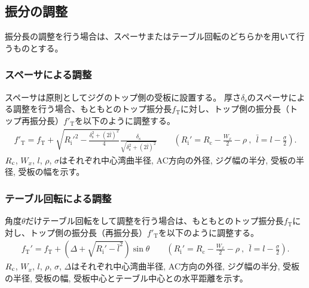 \subsection{振分の調整}
振分長の調整を行う場合は、スペーサまたはテーブル回転のどちらかを用いて行うものとする。

\subsubsection{スペーサによる調整}
スペーサは原則としてジグのトップ側の受板に設置する。
厚さ$\delta_\mathrm s$のスペーサによる調整を行う場合、もともとのトップ振分長$f_\mathrm T$に対し、トップ側の振分長（トップ再振分長）$f'_\mathrm T$を以下のように調整する。
\begin{align*}
  f'_\mathrm T
  = f_\mathrm T
    +\sqrt{R_\mathrm i'^2-\frac{\delta_\mathrm s^2+(2\bar l)^2}4}\frac{\delta_\mathrm s}{\sqrt{\delta_\mathrm s^2+(2\bar l)^2}}\qquad
    \left(R_\mathrm i' = R_\mathrm c-\frac{W_x}2-\rho~,~~\bar l = l-\frac\sigma2\right).
\end{align*}
$R_\textrm c$, $W_x$, $l$, $\rho$, $\sigma$はそれぞれ中心湾曲半径, AC方向の外径, ジグ幅の半分, 受板の半径, 受板の幅を示す。

\subsubsection{テーブル回転による調整}
角度$\theta$だけテーブル回転をして調整を行う場合は、もともとのトップ振分長$f_\mathrm T$に対し、トップ側の振分長（再振分長）$f'_\mathrm T$を以下のように調整する。
\begin{align*}
  f_\mathrm T'
  = f_\mathrm T+\left(\varDelta+\sqrt{R_\mathrm i'-\bar l^2}\right)\sin\theta\qquad
    \left(R_\mathrm i' = R_\mathrm c-\frac{W_x}2-\rho~,~~\bar l = l-\frac\sigma2\right).
\end{align*}
$R_\textrm c$, $W_x$, $l$, $\rho$, $\sigma$, $\varDelta$はそれぞれ中心湾曲半径, AC方向の外径, ジグ幅の半分, 受板の半径, 受板の幅, 受板中心とテーブル中心との水平距離を示す。



